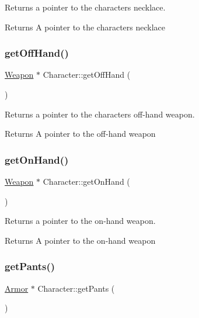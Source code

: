 Returns a pointer to the character\textquotesingle{}s necklace. 

\begin{DoxyReturn}{Returns}
A pointer to the character\textquotesingle{}s necklace 
\end{DoxyReturn}
\mbox{\label{class_character_a3e789de343597dfdf68b4aa45d537878}} 
\subsubsection{\texorpdfstring{getOffHand()}{getOffHand()}}
{\footnotesize\ttfamily \mbox{\hyperlink{class_weapon}{Weapon}} $\ast$ Character\+::get\+Off\+Hand (\begin{DoxyParamCaption}{ }\end{DoxyParamCaption})}



Returns a pointer to the character\textquotesingle{}s off-\/hand weapon. 

\begin{DoxyReturn}{Returns}
A pointer to the off-\/hand weapon 
\end{DoxyReturn}
\mbox{\label{class_character_a91d2c56e020fe4e0b9231fd2b3da2ef4}} 
\subsubsection{\texorpdfstring{getOnHand()}{getOnHand()}}
{\footnotesize\ttfamily \mbox{\hyperlink{class_weapon}{Weapon}} $\ast$ Character\+::get\+On\+Hand (\begin{DoxyParamCaption}{ }\end{DoxyParamCaption})}



Returns a pointer to the on-\/hand weapon. 

\begin{DoxyReturn}{Returns}
A pointer to the on-\/hand weapon 
\end{DoxyReturn}
\mbox{\label{class_character_a201f089787a3b1b1b6c8aa15677f5eb0}} 
\subsubsection{\texorpdfstring{getPants()}{getPants()}}
{\footnotesize\ttfamily \mbox{\hyperlink{class_armor}{Armor}} $\ast$ Character\+::get\+Pants (\begin{DoxyParamCaption}{ }\end{DoxyParamCaption})}



